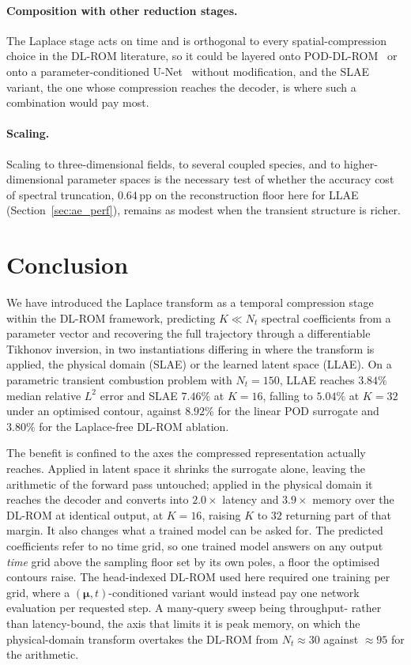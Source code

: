 ﻿\documentclass[a4paper,12pt]{article}
\theoremstyle{definition}
\theoremstyle{remark}
\newcommand{\vmu}{\bm{\mu}}
\begin{document}
\paragraph{Composition with other reduction stages.}
The Laplace stage acts on time and is orthogonal to every spatial-compression choice in the DL-ROM literature, so it could be layered onto POD-DL-ROM~\cite{fresca2022} or onto a parameter-conditioned U-Net~\cite{kastor2026} without modification, and the SLAE variant, the one whose compression reaches the decoder, is where such a combination would pay most.

\paragraph{Scaling.}
Scaling to three-dimensional fields, to several coupled species, and to higher-dimensional parameter spaces is the necessary test of whether the accuracy cost of spectral truncation, $0.64$\,pp on the reconstruction floor here for LLAE (Section~\ref{sec:ae_perf}), remains as modest when the transient structure is richer.

\section{Conclusion}

We have introduced the Laplace transform as a temporal compression stage within the DL-ROM framework, predicting $K \ll N_t$ spectral coefficients from a parameter vector and recovering the full trajectory through a differentiable Tikhonov inversion, in two instantiations differing in where the transform is applied, the physical domain (SLAE) or the learned latent space (LLAE). On a parametric transient combustion problem with $N_t = 150$, LLAE reaches $3.84\%$ median relative $L^2$ error and SLAE $7.46\%$ at $K = 16$, falling to $5.04\%$ at $K = 32$ under an optimised contour, against $8.92\%$ for the linear POD surrogate and $3.80\%$ for the Laplace-free DL-ROM ablation.

The benefit is confined to the axes the compressed representation actually reaches. Applied in latent space it shrinks the surrogate alone, leaving the arithmetic of the forward pass untouched; applied in the physical domain it reaches the decoder and converts into $2.0\times$ latency and $3.9\times$ memory over the DL-ROM at identical output, at $K = 16$, raising $K$ to $32$ returning part of that margin. It also changes what a trained model can be asked for. The predicted coefficients refer to no time grid, so one trained model answers on any output \emph{time} grid above the sampling floor set by its own poles, a floor the optimised contours raise. The head-indexed DL-ROM used here required one training per grid, where a $(\vmu, t)$-conditioned variant would instead pay one network evaluation per requested step. A many-query sweep being throughput- rather than latency-bound, the axis that limits it is peak memory, on which the physical-domain transform overtakes the DL-ROM from $N_t \approx 30$ against $\approx 95$ for the arithmetic.
\end{document}
